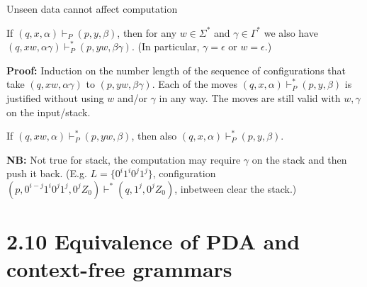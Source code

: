 \documentclass[handout]{beamer}
\begin{document}
\begin{frame}{Unseen data cannot affect computation}

    \begin{lemma}
        If $(q,x,\alpha)\vdash_P (p,y,\beta) $, then for any $w\in \Sigma^*$ and $\gamma\in\Gamma^*$ we also have 
        $(q,xw,\alpha\gamma)\vdash^*_P(p,yw,\beta\gamma)$. (In particular, $\gamma=\epsilon$ or $w=\epsilon$.)
    \end{lemma}
    \textbf{Proof:} Induction on the number length of the sequence of configurations that take $(q,xw,\alpha\gamma)$ to $(p,yw,\beta\gamma)$. Each of the moves $(q,x,\alpha)\vdash^*_P(p,y,\beta)$ is justified without using $w$ and/or $\gamma$ in any way. The moves are still valid with $w,\gamma$ on the input/stack.\hfill\qedsymbol

    \medskip

    \begin{lemma}
        If $(q,xw,\alpha)\vdash^*_P (p,yw,\beta) $, then also $(q,x,\alpha)\vdash^*_P(p,y,\beta)$.
    \end{lemma}
    \textbf{NB:} Not true for stack, the computation may require $\gamma$ on the stack and then push it back. (E.g. $L=\{0^i1^i0^j1^j\}$, configuration $(p,0^{i-j}1^i0^j1^j,0^jZ_0)\vdash^* (q,1^j,0^jZ_0)$, inbetween clear the stack.)

\end{frame}


\section*{2.10 Equivalence of PDA and context-free grammars}
\end{document}

